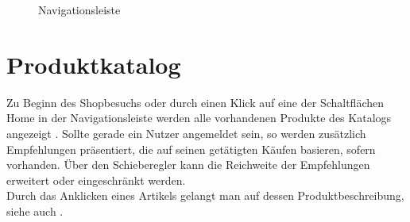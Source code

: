 \begin{figure}[h!]
  \centering
  \caption{Navigationsleiste}
  \label{fig:Navigationsleiste}
\end{figure}


\section{Produktkatalog}
Zu Beginn des Shopbesuchs oder durch einen Klick auf eine der Schaltflächen Home in der Navigationsleiste werden alle vorhandenen Produkte des Katalogs angezeigt . Sollte gerade ein Nutzer angemeldet sein, so werden zusätzlich Empfehlungen prä\-sen\-tiert, die auf seinen getätigten Käufen basieren, sofern vorhanden. Über den Schieberegler  kann die Reichweite der Empfehlungen erweitert oder eingeschränkt werden. \\
Durch das Anklicken eines Artikels gelangt man auf dessen Produktbeschreibung, siehe auch .

